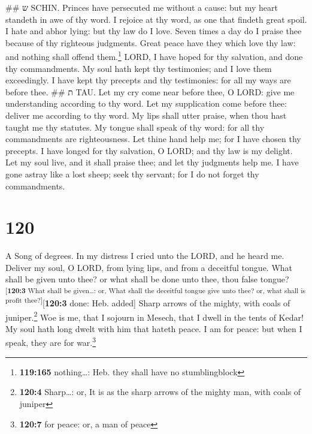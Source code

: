 \#\# ש SCHIN.  Princes have persecuted me without a
cause: but my heart standeth in awe of thy word.  I
rejoice at thy word, as one that findeth great spoil.  I
hate and abhor lying: but thy law do I love.  Seven
times a day do I praise thee because of thy righteous judgments.
 Great peace have they which love thy law: and nothing
shall offend them.\footnote{\textbf{119:165} nothing\ldots: Heb. they
  shall have no stumblingblock}  LORD, I have hoped for
thy salvation, and done thy commandments.  My soul hath
kept thy testimonies; and I love them exceedingly.  I
have kept thy precepts and thy testimonies: for all my ways are before
thee. \#\# ת TAU.  Let my cry come near before thee, O
LORD: give me understanding according to thy word.  Let
my supplication come before thee: deliver me according to thy word.
 My lips shall utter praise, when thou hast taught me
thy statutes.  My tongue shall speak of thy word: for
all thy commandments are righteousness.  Let thine hand
help me; for I have chosen thy precepts.  I have longed
for thy salvation, O LORD; and thy law is my delight. 
Let my soul live, and it shall praise thee; and let thy judgments help
me.  I have gone astray like a lost sheep; seek thy
servant; for I do not forget thy commandments.

\hypertarget{section-121}{%
\section{120}\label{section-121}}

A Song of degrees.  In my distress I cried unto the LORD,
and he heard me.  Deliver my soul, O LORD, from lying
lips, and from a deceitful tongue.  What shall be given
unto thee? or what shall be done unto thee, thou false
tongue?\textsuperscript{{[}\textbf{120:3} What shall be given\ldots: or,
What shall the deceitful tongue give unto thee? or, what shall is profit
thee?{]}}{[}\textbf{120:3} done: Heb. added{]}  Sharp
arrows of the mighty, with coals of juniper.\footnote{\textbf{120:4}
  Sharp\ldots: or, It is as the sharp arrows of the mighty man, with
  coals of juniper}  Woe is me, that I sojourn in Mesech,
that I dwell in the tents of Kedar!  My soul hath long
dwelt with him that hateth peace.  I am for peace: but
when I speak, they are for war.\footnote{\textbf{120:7} for peace: or, a
  man of peace}

